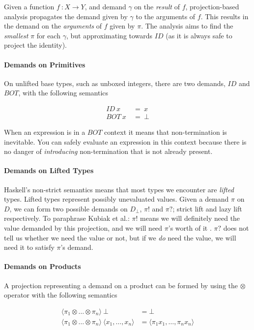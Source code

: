 Given a function $f \ : X \rightarrow Y$, and demand $\gamma$ on the
\emph{result} of $f$, projection-based analysis propagates the demand given by
$\gamma$ to the arguments of $f$. This results in the demand on the
\emph{arguments} of $f$ given by $\pi$.  The analysis aims to find the
\emph{smallest} $\pi$ for each $\gamma$, but approximating towards $ID$ (as
it is always safe to project the identity).

\paragraph{Demands on Primitives}
On unlifted base types, such as unboxed integers, there are two demands,
$ID$ and $BOT$, with the following semantics


\begin{align}
ID \ x \ &= \ x \\
BOT \ x \ &= \ \bot
\end{align}


When an expression is in a $BOT$ context it means that non-termination is
inevitable. You can safely evaluate an expression in this context because there
is no danger of \emph{introducing} non-termination that is not already present.

\paragraph{Demands on Lifted Types} Haskell's non-strict semantics means that
most types we encounter are \emph{lifted} types.  Lifted types represent
possibly unevaluated values. Given a demand $\pi$ on $D$, we can form two
possible demands on $D_{\bot}$, $\pi!$ and $\pi?$; strict lift and lazy lift
respectively. To paraphrase Kubiak et al.: $\pi!$ means we will definitely need
the value demanded by this projection, and we will need $\pi$'s worth of it
\citep{kubiak}. $\pi?$ does not tell us whether we need the value or not, but if
we \emph{do} need the value, we will need it to satisfy $\pi$'s demand.

\paragraph{Demands on Products} A projection representing a demand on a product
can be formed by using the $\otimes$ operator with the following semantics

\begin{align*}
\langle \pi_{1} \otimes \dots \otimes \pi_{n} \rangle \ \bot &= \bot \\
\langle \pi_{1} \otimes \dots \otimes \pi_{n} \rangle \ 
\langle x_{1}, \dots, x_{n} \rangle &= \langle \pi_{1} x_{1}, \dots, \pi_{n} x_{n} \rangle
\end{align*}

